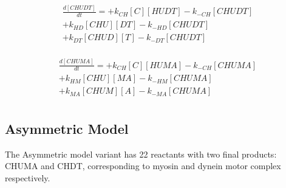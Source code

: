 \begin{equation}
\begin{split}
\frac{d[CHUDT]}{dt} = + k_{CH}[C][HUDT] - k_{-CH}[CHUDT]  \\%
                      + k_{HD}[CHU][DT] - k_{-HD}[CHUDT]  \\%
                      + k_{DT}[CHUD][T] - k_{-DT}[CHUDT]  \\%
\end{split}
\end{equation}

\begin{equation}
\begin{split}
\frac{d[CHUMA]}{dt} = + k_{CH}[C][HUMA] - k_{-CH}[CHUMA]  \\%
                      + k_{HM}[CHU][MA] - k_{-HM}[CHUMA]  \\%
                      + k_{MA}[CHUM][A] - k_{-MA}[CHUMA]  \\%
\end{split}
\end{equation}

\subsection{Asymmetric Model}

The Asymmetric model variant has 22 reactants with two final products: CHUMA and CHDT, corresponding to myosin and dynein motor complex respectively.

